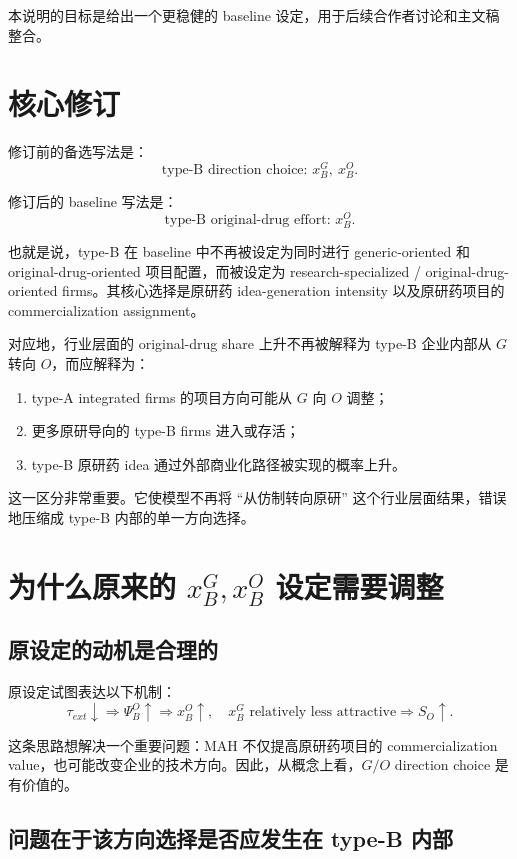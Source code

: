 \documentclass[12pt]{article}
\begin{document}
本说明的目标是给出一个更稳健的 baseline 设定，用于后续合作者讨论和主文稿整合。

\section{核心修订}

修订前的备选写法是：
\[
\text{type-B direction choice: } x_B^G,\ x_B^O.
\]

修订后的 baseline 写法是：
\[
\text{type-B original-drug effort: } x_B^O.
\]

也就是说，type-B 在 baseline 中不再被设定为同时进行 generic-oriented 和 original-drug-oriented 项目配置，而被设定为 research-specialized / original-drug-oriented firms。其核心选择是原研药 idea-generation intensity 以及原研药项目的 commercialization assignment。

对应地，行业层面的 original-drug share 上升不再被解释为 type-B 企业内部从 $G$ 转向 $O$，而应解释为：
\begin{enumerate}
    \item type-A integrated firms 的项目方向可能从 $G$ 向 $O$ 调整；
    \item 更多原研导向的 type-B firms 进入或存活；
    \item type-B 原研药 idea 通过外部商业化路径被实现的概率上升。
\end{enumerate}

这一区分非常重要。它使模型不再将 ``从仿制转向原研'' 这个行业层面结果，错误地压缩成 type-B 内部的单一方向选择。

\section{为什么原来的 $x_B^G,x_B^O$ 设定需要调整}

\subsection{原设定的动机是合理的}

原设定试图表达以下机制：
\[
\tau_{ext}\downarrow
\Rightarrow
\Psi_B^O\uparrow
\Rightarrow
x_B^O\uparrow,\quad x_B^G \text{ relatively less attractive}
\Rightarrow
S_O\uparrow.
\]

这条思路想解决一个重要问题：MAH 不仅提高原研药项目的 commercialization value，也可能改变企业的技术方向。因此，从概念上看，$G/O$ direction choice 是有价值的。

\subsection{问题在于该方向选择是否应发生在 type-B 内部}
\end{document}
